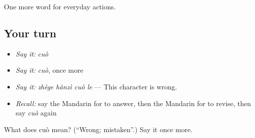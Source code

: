 \begin{grammarlens}[title={What you've built}]
One more word for everyday actions.
\end{grammarlens}

\subsection*{Your turn}
\begin{itemize}
\raggedright
  \item \emph{Say it:} \emph{cuò}
  \item \emph{Say it:} \emph{cuò}, once more
  \item \emph{Say it:} \emph{zhège hànzì cuò le} — This character is wrong.
  \item \emph{Recall:} say the Mandarin for to answer, then the Mandarin for to revise, then say \emph{cuò} again
\end{itemize}

\begin{tcolorbox}[breakable,colback=teal!4,colframe=teal!35!black,title={Before you move on}]
What does cuò mean? (\textquotedblleft{}Wrong; mistaken\textquotedblright{}.) Say it once more.
\end{tcolorbox}
